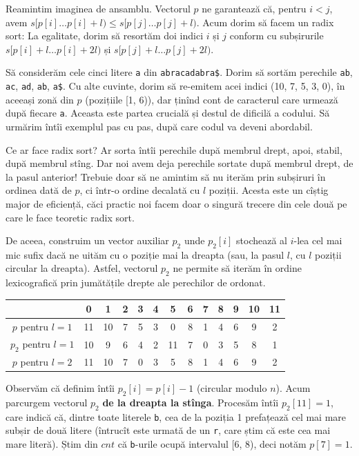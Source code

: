 \documentclass[../main.tex]{subfiles}
\begin{document}
Reamintim imaginea de ansamblu. Vectorul $p$ ne garantează că, pentru $i < j$, avem $s[p[i] \dots p[i] + l) \leq s[p[j] \dots p[j] + l)$. Acum dorim să facem un radix sort: La egalitate, dorim să resortăm doi indici $i$ și $j$ conform cu subșirurile $s[p[i] + l \dots p[i] + 2l)$ și $s[p[j] + l \dots p[j] + 2l)$.

Să considerăm cele cinci litere \texttt{a} din \texttt{abracadabra\$}. Dorim să sortăm perechile \texttt{ab}, \texttt{ac}, \texttt{ad}, \texttt{ab}, \texttt{a\$}. Cu alte cuvinte, dorim să re-emitem acei indici (10, 7, 5, 3, 0), în aceeași zonă din $p$ (pozițiile [1, 6)), dar ținînd cont de caracterul care urmează după fiecare \texttt{a}. Aceasta este partea crucială și destul de dificilă a codului. Să urmărim întîi exemplul pas cu pas, după care codul va deveni abordabil.

Ce ar face radix sort? Ar sorta întîi perechile după membrul drept, apoi, stabil, după membrul stîng. Dar noi avem deja perechile sortate după membrul drept, de la pasul anterior! Trebuie doar să ne amintim să nu iterăm prin subșiruri în ordinea dată de $p$, ci într-o ordine decalată cu $l$ poziții. Acesta este un cîștig major de eficiență, căci practic noi facem doar o singură trecere din cele două pe care le face teoretic radix sort.

De aceea, construim un vector auxiliar $p_2$ unde $p_2[i]$ stochează al $i$-lea cel mai mic sufix dacă ne uităm cu o poziție mai la dreapta (sau, la pasul $l$, cu $l$ poziții circular la dreapta). Astfel, vectorul $p_2$ ne permite să iterăm în ordine lexicografică prin jumătățile drepte ale perechilor de ordonat.

\begin{table}[H]
  \centering
  \begin{tabular}{c|cccccccccccc}
    & 0 & 1 & 2 & 3 & 4 & 5 & 6 & 7 & 8 & 9 & 10 & 11 \\
    \hline
    $p$ pentru $l = 1$ & 11 & 10 & 7 & 5 & 3 & 0 & 8 & 1 & 4 & 6 & 9 & 2 \\
    $p_2$ pentru $l = 1$ & 10 & 9 & 6 & 4 & 2 & 11 & 7 & 0 & 3 & 5 & 8 & 1 \\
    $p$ pentru $l = 2$ & 11 & 10 & 7 & 0 & 3 & 5 & 8 & 1 & 4 & 6 & 9 & 2 \\
  \end{tabular}
\end{table}

Observăm că definim întîi $p_2[i] = p[i] - 1$ (circular modulo $n$). Acum parcurgem vectorul $p_2$ \textbf{de la dreapta la stînga}. Procesăm întîi $p_2[11] = 1$, care indică că, dintre toate literele \texttt{b}, cea de la poziția 1 prefațează cel mai mare subșir de două litere (întrucît este urmată de un \texttt{r}, care știm că este cea mai mare literă). Știm din $cnt$ că \texttt{b}-urile ocupă intervalul [6, 8), deci notăm $p[7] = 1$.
\end{document}
